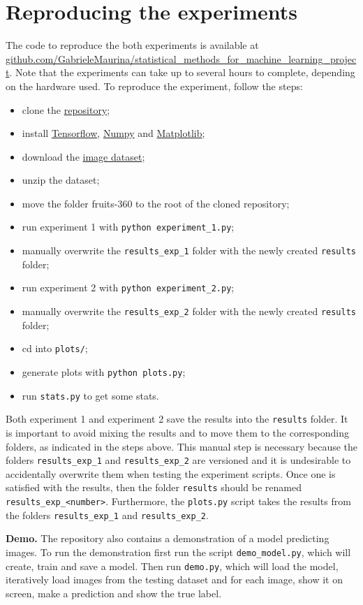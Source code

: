 \section{Reproducing the experiments}
\label{sec:repro}
The code to reproduce the both experiments is available at \href{https://github.com/GabrieleMaurina/statistical\_methods\_for\_machine\_learning\_project}{github.com/GabrieleMaurina/statistical\_methods\_for\_machine\_learning\_project}. Note that the experiments can take up to several hours to complete, depending on the hardware used. To reproduce the experiment, follow the steps:
\begin{itemize}
    \item clone the \href{https://github.com/GabrieleMaurina/statistical\_methods\_for\_machine\_learning\_project}{repository};
    \item install \href{https://pypi.org/project/tensorflow/}{Tensorflow}, \href{https://pypi.org/project/numpy/}{Numpy} and \href{https://pypi.org/project/matplotlib/}{Matplotlib};
    \item download the \href{https://www.kaggle.com/moltean/fruits}{image dataset};
    \item unzip the dataset;
    \item move the folder fruits-360 to the root of the cloned repository;
    \item run experiment 1 with \texttt{python experiment\_1.py};
    \item manually overwrite the \texttt{results\_exp\_1} folder with the newly created \texttt{results} folder;
    \item run experiment 2 with \texttt{python experiment\_2.py};
    \item manually overwrite the \texttt{results\_exp\_2} folder with the newly created \texttt{results} folder;
    \item cd into \texttt{plots/};
    \item generate plots with \texttt{python plots.py};
    \item run \texttt{stats.py} to get some stats.
\end{itemize}
Both experiment 1 and experiment 2 save the results into the \texttt{results} folder. It is important to avoid mixing the results and to move them to the corresponding folders, as indicated in the steps above. This manual step is necessary because the folders \texttt{results\_exp\_1} and \texttt{results\_exp\_2} are versioned and it is undesirable to accidentally overwrite them when testing the experiment scripts. Once one is satisfied with the results, then the folder \texttt{results} should be renamed \texttt{results\_exp\_<number>}. Furthermore, the \texttt{plots.py} script takes the results from the folders \texttt{results\_exp\_1} and \texttt{results\_exp\_2}.

\textbf{Demo.} The repository also contains a demonstration of a model predicting images. To run the demonstration first run the script \texttt{demo\_model.py}, which will create, train and save a model. Then run \texttt{demo.py}, which will load the model, iteratively load images from the testing dataset and for each image, show it on screen, make a prediction and show the true label.
